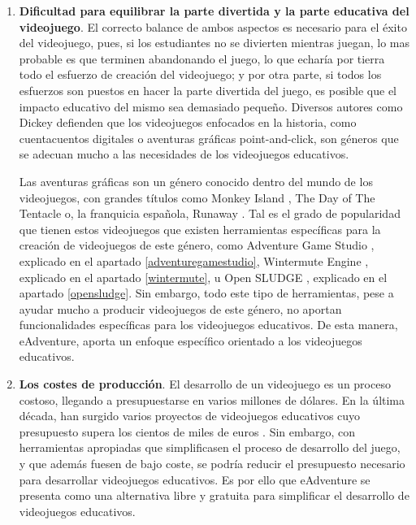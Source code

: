 \begin{enumerate}
	\item \textbf{Dificultad para equilibrar la parte divertida y la parte educativa del videojuego}. El correcto balance de ambos aspectos es necesario para el éxito del videojuego, pues, si los estudiantes no se divierten mientras juegan, lo mas probable es que terminen abandonando el juego, lo que echaría por tierra todo el esfuerzo de creación del videojuego; y por otra parte, si todos los esfuerzos son puestos en hacer la parte divertida del juego, es posible que el impacto educativo del mismo sea demasiado pequeño. Diversos autores como Dickey \cite{Dickey2006} defienden que los videojuegos enfocados en la historia, como cuentacuentos digitales o aventuras gráficas point-and-click, son géneros que se adecuan mucho a las necesidades de los videojuegos educativos.
	
	Las aventuras gráficas son un género conocido dentro del mundo de los videojuegos, con grandes títulos como Monkey Island \cite{monkeyisland}, The Day of The Tentacle \cite{dayofthetentacle} o, la franquicia española, Runaway \cite{runaway}. Tal es el grado de popularidad que tienen estos videojuegos que existen herramientas específicas para la creación de videojuegos de este género, como Adventure Game Studio \cite{agsmanual}, explicado en el apartado \ref{adventuregamestudio}, Wintermute Engine \cite{wintermuteengine}, explicado en el apartado \ref{wintermute}, u Open SLUDGE \cite{opensludge}, explicado en el apartado \ref{opensludge}. Sin embargo, todo este tipo de herramientas, pese a ayudar mucho a producir videojuegos de este género, no aportan funcionalidades específicas para los videojuegos educativos. De esta manera, eAdventure, aporta un enfoque específico orientado a los videojuegos educativos. 
	
	\item \textbf{Los costes de producción}. El desarrollo de un videojuego es un proceso  costoso, llegando a presupuestarse en varios millones de dólares. En la última década, han surgido varios proyectos de videojuegos educativos cuyo presupuesto supera los cientos de miles de euros \cite{Michael2005}. Sin embargo, con herramientas apropiadas que simplificasen el proceso de desarrollo del juego, y que además fuesen de bajo coste, se podría reducir el presupuesto necesario para desarrollar videojuegos educativos. Es por ello que eAdventure se presenta como una alternativa libre y gratuita para simplificar el desarrollo de videojuegos educativos. 
	

\end{enumerate}
